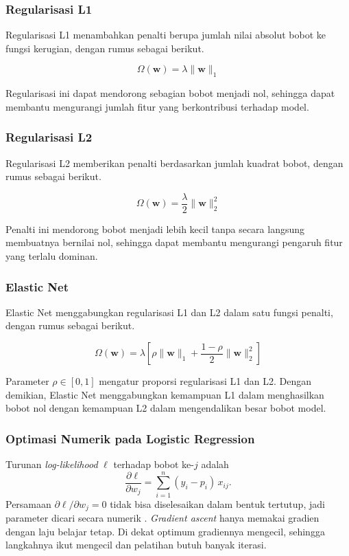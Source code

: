 \subsubsection{Regularisasi L1}
Regularisasi L1 menambahkan penalti berupa jumlah nilai absolut bobot ke fungsi kerugian, dengan rumus sebagai berikut.

\[
\Omega(\mathbf{w})=\lambda\lVert\mathbf{w}\rVert_1
\]

Regularisasi ini dapat mendorong sebagian bobot menjadi nol, sehingga dapat membantu mengurangi jumlah fitur yang berkontribusi terhadap model.

\subsubsection{Regularisasi L2}
Regularisasi L2 memberikan penalti berdasarkan jumlah kuadrat bobot, dengan rumus sebagai berikut.

\[
\Omega(\mathbf{w})=\frac{\lambda}{2}\lVert\mathbf{w}\rVert_2^2
\]

Penalti ini mendorong bobot menjadi lebih kecil tanpa secara langsung membuatnya bernilai nol, sehingga dapat membantu mengurangi pengaruh fitur yang terlalu dominan.

\subsubsection{Elastic Net}
Elastic Net menggabungkan regularisasi L1 dan L2 dalam satu fungsi penalti, dengan rumus sebagai berikut.

\[
\Omega(\mathbf{w})=
\lambda\left[
\rho\lVert\mathbf{w}\rVert_1+
\frac{1-\rho}{2}\lVert\mathbf{w}\rVert_2^2
\right]
\]

Parameter $\rho\in[0,1]$ mengatur proporsi regularisasi L1 dan L2. Dengan demikian, Elastic Net menggabungkan kemampuan L1 dalam menghasilkan bobot nol dengan kemampuan L2 dalam mengendalikan besar bobot model.

\subsubsection{Optimasi Numerik pada Logistic Regression}
\label{sec:logreg-optimasi}
Turunan \textit{log-likelihood} $\ell$ terhadap bobot ke-$j$ adalah
\[
\frac{\partial\ell}{\partial w_j}=\sum_{i=1}^{n}(y_i-p_i)\,x_{ij}.
\]
Persamaan $\partial\ell/\partial w_j=0$ tidak bisa diselesaikan dalam bentuk tertutup, jadi parameter dicari secara numerik \cite[bagian~12.2.1]{ref:shalizi-2012}. \textit{Gradient ascent} hanya memakai gradien dengan laju belajar tetap. Di dekat optimum gradiennya mengecil, sehingga langkahnya ikut mengecil dan pelatihan butuh banyak iterasi.


